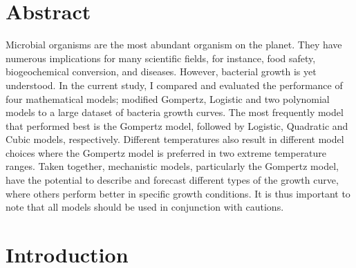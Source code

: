 \documentclass[12pt]{article}
\begin{document}
  \newpage
  \setcounter{page}{1}
  \begin{linenumbers}
  
 \section{Abstract}
 
 \noindent Microbial organisms are the most abundant organism on the planet. They have numerous implications for many scientific fields, for instance, food safety, biogeochemical conversion, and diseases. However, bacterial growth is yet understood. In the current study, I compared and evaluated the performance of four mathematical models; modified Gompertz, Logistic and two polynomial models to a large dataset of bacteria growth curves. The most frequently model that performed best is the Gompertz model, followed by Logistic, Quadratic and Cubic models, respectively. Different temperatures also result in different model choices where the Gompertz model is preferred in two extreme temperature ranges. Taken together, mechanistic models, particularly the Gompertz model, have the potential to describe and forecast different types of the growth curve, where others perform better in specific growth conditions. It is thus important to note that all models should be used in conjunction with cautions.
 
 \newpage

 \section{Introduction}


\end{linenumbers}
\end{document}
